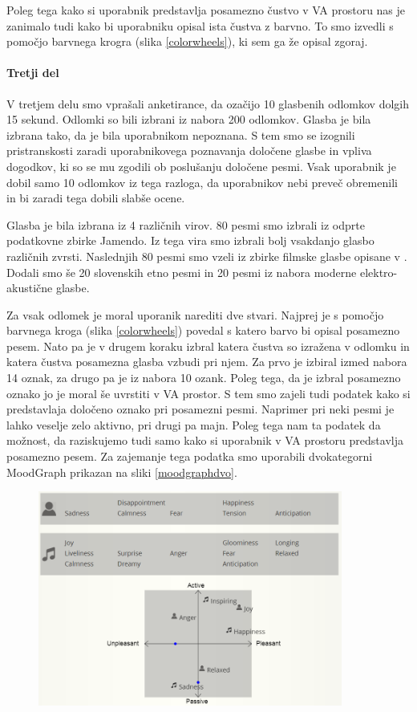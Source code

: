 \documentclass[a4paper, 12pt]{book}
\begin{document}
{\begin{figure}[ht]
\caption{}
\label{moodgraph}
\end{figure}

Poleg tega kako si uporabnik predstavlja posamezno čustvo v VA prostoru nas je zanimalo tudi kako bi uporabniku opisal ista čustva z barvno. To smo izvedli s pomočjo barvnega krogra (slika \ref{colorwheels}), ki sem ga že opisal zgoraj. 

\paragraph{Tretji del}

V tretjem delu smo vprašali anketirance, da ozačijo 10 glasbenih odlomkov dolgih 15 sekund. Odlomki so bili izbrani iz nabora 200 odlomkov. Glasba je bila izbrana tako, da je bila uporabnikom nepoznana. S tem smo se izognili pristranskosti zaradi uporabnikovega poznavanja določene glasbe in vpliva dogodkov, ki so se mu zgodili ob poslušanju določene pesmi. Vsak uporabnik je dobil samo 10 odlomkov iz tega razloga, da uporabnikov nebi preveč obremenili in bi zaradi tega dobili slabše ocene. 

Glasba je bila izbrana iz 4 različnih virov. 80 pesmi smo izbrali iz odprte podatkovne zbirke Jamendo. Iz tega vira smo izbrali bolj vsakdanjo glasbo različnih zvrsti. Naslednjih 80 pesmi smo vzeli iz zbirke filmske glasbe opisane v \cite{eerola2010comparison}. Dodali smo še 20 slovenskih etno pesmi in 20 pesmi iz nabora moderne elektro-akustične glasbe. 

Za vsak odlomek je moral uporanik narediti dve stvari. Najprej je s pomočjo barvnega kroga (slika \ref{colorwheels}) povedal s katero barvo bi opisal posamezno pesem. Nato pa je v drugem koraku izbral katera čustva so izražena v odlomku in katera čustva posamezna glasba vzbudi pri njem. Za prvo je izbiral izmed nabora 14 oznak, za drugo pa je iz nabora 10 ozank. Poleg tega, da je izbral posamezno oznako jo je moral še uvrstiti v VA prostor. S tem smo zajeli tudi podatek kako si predstavlaja določeno oznako pri posamezni pesmi. Naprimer pri neki pesmi je lahko veselje zelo aktivno, pri drugi pa majn. Poleg tega nam ta podatek da možnost, da raziskujemo tudi samo kako si uporabnik v VA prostoru predstavlja posamezno pesem. Za zajemanje tega podatka smo uporabili dvokategorni MoodGraph prikazan na sliki \ref{moodgraphdvo}.

\begin{figure}[hbt]
\centering
\includegraphics[width=10cm]{images/moodgraphdvo.png}


\end{figure}}
\end{document}
